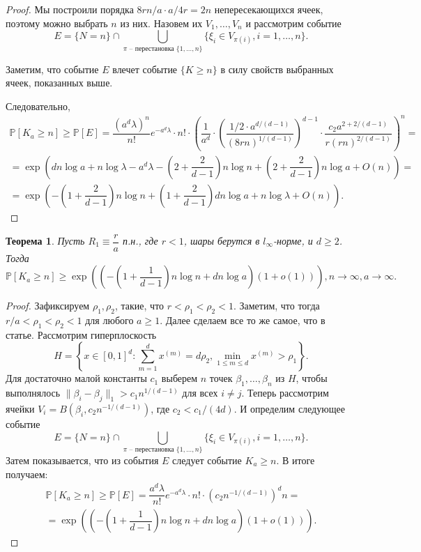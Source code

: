 \documentclass[12pt]{article}
\theoremstyle{plain}
\newtheorem{thm}{Теорема} %
\theoremstyle{definition}
\theoremstyle{remark}
\def\geq{\geqslant}
\def\leq{\leqslant}
\newcommand{\slim}{\sum\limits}
\newcommand{\PP}{\mathbb{P}}
\begin{document}
\begin{proof}
    
    Мы построили порядка $8rn/a \cdot a/4r = 2n$ непересекающихся ячеек, поэтому можно выбрать $n$ из них. Назовем их $V_1, \ldots, V_n$  и рассмотрим событие $$E = \{N=n\}\cap \bigcup\limits_{\pi \text{ -- перестановка } \{1, \ldots, n\}} \{\xi_i \in V_{\pi(i)}, i = 1, \ldots, n\}.$$
                         
    Заметим, что событие $E$ влечет событие $\{K \geq n\}$ в силу свойств выбранных ячеек, показанных выше.
  
    Следовательно, 
    \begin{multline*}
        \PP[K_a\geq n] \geq \PP[E] = \dfrac{(a^d\lambda)^n}{n!}e^{-a^d\lambda}\cdot n!
        \cdot \left(\dfrac{1}{a^d}\cdot\left(\dfrac{1/2\cdot a^{d/(d-1)}}{(8rn)^{1/(d-1)}}\right)^{d-1}\cdot
        \dfrac{c_2a^{2+ 2/(d-1)}}{r(rn)^{2/(d-1)}}\right)^n = \\
        =\exp\left(dn\log a + n\log\lambda - a^d\lambda - \left(2+\dfrac{2}{d-1}\right)n\log n + \left(2+\dfrac{2}{d-1}\right) n\log a  + O(n)\right) = \\
        =\exp\left(-\left(1+ \dfrac{2}{d-1}\right)n\log n + \left(1 + \dfrac{2}{d-1}\right)dn\log a + n\log\lambda + O(n)\right).
    \end{multline*}{}
\end{proof}{}

\begin{thm}
Пусть $R_1\equiv \dfrac{r}{a}$ п.н., где $r<1$, шары берутся в $l_\infty$-норме, и $d\geq 2$. Тогда $$\PP[K_a \geq n] \geq \exp \left(\left(-\left(1+\dfrac{1}{d-1}\right)n\log n + dn\log a \right)(1 + o(1))\right), n \to \infty, a\to \infty.$$
\end{thm}{}

\begin{proof} 
Зафиксируем $\rho_1, \rho_2$, такие, что $r<\rho_1<\rho_2<1$. Заметим, что тогда $r/a<\rho_1<\rho_2<1$ для любого $a\geq 1$. Далее сделаем все то же самое, что в статье. Рассмотрим гиперплоскость $$H = \left\{x\in[0, 1]^d \colon \slim_{m=1}^dx^{(m)} = d\rho_2, \min\limits_{1\leq m \leq d}x^{(m)}>\rho_1\right\}.$$ 
Для достаточно малой константы $c_1$ выберем $n$ точек $\beta_1, \ldots, \beta_n$ из $H$, чтобы выполнялось $\|\beta_i - \beta_j\|_1 > c_1n^{1/(d-1)}$ для всех $i\not= j$. Теперь рассмотрим ячейки $V_i = B(\beta_i, c_2n^{-1/(d-1)})$, где $c_2 < c_1/(4d)$. И определим следующее событие $$E = \{N = n\} \cap  \bigcup\limits_{\pi \text{ -- перестановка } \{1, \ldots, n\}} \{\xi_i \in V_{\pi(i)}, i = 1, \ldots, n\}.$$
Затем показывается, что из события $E$ следует событие $K_a \geq n$. В итоге получаем:
\begin{multline*}
    \PP[K_a \geq n] \geq \PP[E] = \dfrac{a^d\lambda}{n!}e^{-a^d\lambda}\cdot n!\cdot \left(c_2n^{-1/(d-1)}\right)^dn = \\
    =\exp \left(\left(-\left(1+\dfrac{1}{d-1}\right)n\log n + dn\log a\right)(1+o(1))\right).
\end{multline*}{}
\end{proof}{}
\end{document}

